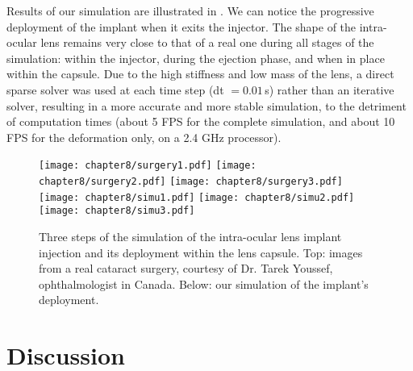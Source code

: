Results of our simulation are illustrated in . We can notice the progressive deployment of the implant when it exits the injector.  The shape of the intra-ocular lens remains very close to that of a real one during all stages of the simulation: within the injector, during the ejection phase, and when in place within the capsule. Due to the high stiffness and low mass of the lens, a direct sparse solver was used at each time step (dt $= 0.01\,$s) rather than an iterative solver, resulting in a more accurate and more stable simulation, to the detriment of computation times (about 5 FPS for the complete simulation, and about 10 FPS for the deformation only, on a 2.4 GHz processor).

\begin{figure}[ht]
\centering
\texttt{[image: chapter8/surgery1.pdf]}
\hfill
\texttt{[image: chapter8/surgery2.pdf]}
\hfill
\texttt{[image: chapter8/surgery3.pdf]} \\
\vspace{0.1cm}
\texttt{[image: chapter8/simu1.pdf]}
\hfill
\texttt{[image: chapter8/simu2.pdf]}
\hfill
\texttt{[image: chapter8/simu3.pdf]}
\caption [Lens imlant] {Three steps of the simulation of the intra-ocular lens implant injection and its deployment within the lens capsule. Top: images from a real cataract surgery, courtesy of Dr. Tarek Youssef, ophthalmologist in Canada. Below: our simulation of the implant's deployment.}
\label{chap8:fig-simu-results}
\end{figure}


\section{Discussion}

